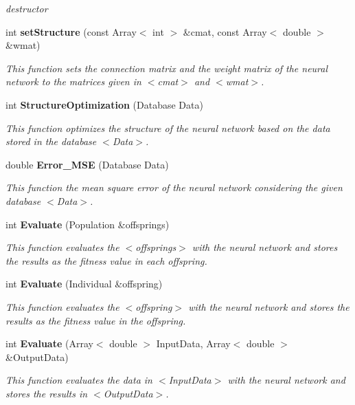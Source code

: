 \begin{CompactItemize}
\begin{CompactList}\small\item\em destructor\item\end{CompactList}\item 
int {\bf set\-Structure} (const Array$<$ int $>$ \&cmat, const Array$<$ double $>$ \&wmat)
\begin{CompactList}\small\item\em This function sets the connection matrix and the weight matrix of the neural network to the matrices given in $<$cmat$>$ and $<$wmat$>$.\item\end{CompactList}\item 
int {\bf Structure\-Optimization} (Database Data)
\begin{CompactList}\small\item\em This function optimizes the structure of the neural network based on the data stored in the database $<$Data$>$.\item\end{CompactList}\item 
double {\bf Error\_\-MSE} (Database Data)
\begin{CompactList}\small\item\em This function the mean square error of the neural network considering the given database $<$Data$>$.\item\end{CompactList}\item 
int {\bf Evaluate} (Population \&offsprings)
\begin{CompactList}\small\item\em This function evaluates the $<$offsprings$>$ with the neural network and stores the results as the fitness value in each offspring.\item\end{CompactList}\item 
int {\bf Evaluate} (Individual \&offspring)
\begin{CompactList}\small\item\em This function evaluates the $<$offspring$>$ with the neural network and stores the results as the fitness value in the offspring.\item\end{CompactList}\item 
int {\bf Evaluate} (Array$<$ double $>$ Input\-Data, Array$<$ double $>$ \&Output\-Data)
\begin{CompactList}\small\item\em This function evaluates the data in $<$Input\-Data$>$ with the neural network and stores the results in $<$Output\-Data$>$.\item\end{CompactList}\item 

\end{CompactItemize}
